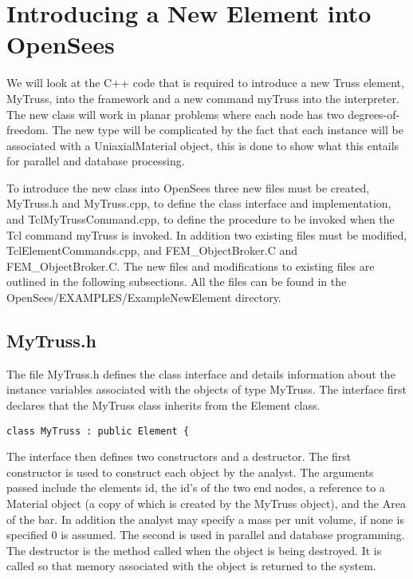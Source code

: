 \documentclass[12pt]{article}
\begin{document}
\section{Introducing a New Element into OpenSees}
We will look at the C++ code that is required to introduce a new Truss
element, MyTruss, into the framework and a new command myTruss into
the interpreter. The new class will work in planar problems where each
node has two degrees-of-freedom. The new type will be complicated by
the fact that each instance will be associated with a UniaxialMaterial
object, this is done to show what this entails for parallel and
database processing. 

To introduce the new class into OpenSees three new files must be
created, {\sf MyTruss.h} and {\sf MyTruss.cpp}, to define the class
interface and implementation, and {\sf TclMyTrussCommand.cpp}, to
define the procedure to be invoked when the Tcl command myTruss is
invoked. In addition two existing files must be modified, {\sf
TclElementCommands.cpp}, and {\sf FEM\_ObjectBroker.C} and {\sf
FEM\_ObjectBroker.C}. The new files and modifications to existing
files are outlined in the following subsections. All the files can be
found in the OpenSees/EXAMPLES/ExampleNewElement directory.  

\subsection {\sf MyTruss.h}
The file {\sf MyTruss.h} defines the class interface and details
information about the instance variables associated with the objects
of type MyTruss. The interface first declares that the MyTruss class
inherits from the Element class.  

{\sf\small \begin{verbatim}
class MyTruss : public Element {
\end{verbatim} }

The interface then defines two constructors and a destructor. The
first constructor is used to construct each object by the analyst. The
arguments passed include the elements id, the id's of the two end
nodes, a reference to a Material object (a copy of which is created by
the MyTruss object), and the Area of the
bar. In addition the analyst may specify a mass per unit volume, if
none is specified $0$ is assumed. The second is used in parallel and
database programming. The destructor is the method called when the
object is being destroyed. It is called so that memory associated with
the object is returned to the system.  
\end{document}
